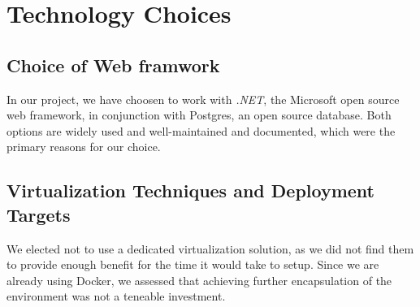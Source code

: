 
\section{Technology Choices}

\subsection{Choice of Web framwork}
In our project, we have choosen to work with \textit{.NET}, the Microsoft open source web framework, in conjunction with Postgres, an open source database.
Both options are widely used and well-maintained and documented, which were the primary reasons for our choice.



\subsection{Virtualization Techniques and Deployment Targets}

We elected not to use a dedicated virtualization solution, as we did not find them to provide enough benefit for the time it would take to setup. Since we are already using Docker, we assessed that achieving further encapsulation of the environment was not a teneable investment.

